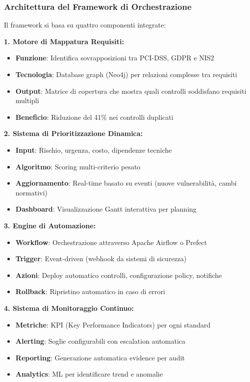 \subsubsection{Architettura del Framework di Orchestrazione}

Il framework si basa su quattro componenti integrate:

\textbf{1. Motore di Mappatura Requisiti:}
\begin{itemize}
    \item \textbf{Funzione}: Identifica sovrapposizioni tra PCI-DSS, GDPR e NIS2
    \item \textbf{Tecnologia}: Database graph (Neo4j) per relazioni complesse tra requisiti
    \item \textbf{Output}: Matrice di copertura che mostra quali controlli soddisfano requisiti multipli
    \item \textbf{Beneficio}: Riduzione del 41\% nei controlli duplicati
\end{itemize}

\textbf{2. Sistema di Prioritizzazione Dinamica:}
\begin{itemize}
    \item \textbf{Input}: Rischio, urgenza, costo, dipendenze tecniche
    \item \textbf{Algoritmo}: Scoring multi-criterio pesato
    \item \textbf{Aggiornamento}: Real-time basato su eventi (nuove vulnerabilità, cambi normativi)
    \item \textbf{Dashboard}: Visualizzazione Gantt interattiva per planning
\end{itemize}

\textbf{3. Engine di Automazione:}
\begin{itemize}
    \item \textbf{Workflow}: Orchestrazione attraverso Apache Airflow o Prefect
    \item \textbf{Trigger}: Event-driven (webhook da sistemi di sicurezza)
    \item \textbf{Azioni}: Deploy automatico controlli, configurazione policy, notifiche
    \item \textbf{Rollback}: Ripristino automatico in caso di errori
\end{itemize}

\textbf{4. Sistema di Monitoraggio Continuo:}
\begin{itemize}
    \item \textbf{Metriche}: KPI (Key Performance Indicators) per ogni standard
    \item \textbf{Alerting}: Soglie configurabili con escalation automatica
    \item \textbf{Reporting}: Generazione automatica evidence per audit
    \item \textbf{Analytics}: ML per identificare trend e anomalie
\end{itemize}

